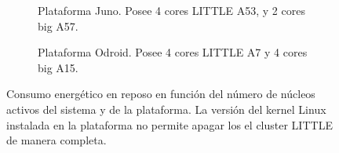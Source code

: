 \begin{figure}
  \setlength{\fboxsep}{-5pt}
  \centering
  \begin{subfigure}{0.75\textwidth}
    \centering
    \caption{Plataforma Juno. Posee 4 cores LITTLE A53, y 2 cores big A57.}
      \label{}
    \end{subfigure}
\vspace{0.5cm}

    \begin{subfigure}{0.75\textwidth}
      \centering
      \caption{Plataforma Odroid. Posee 4 cores LITTLE A7 y 4 cores big A15.}
      \label{}
    \end{subfigure}  
    
  \caption{Consumo energético en reposo en función del número de núcleos
    activos del sistema y de la plataforma. La versión del kernel Linux
    instalada en la plataforma \odroid no permite apagar los el cluster
    LITTLE de manera completa.}
  \label{}
\end{figure}







